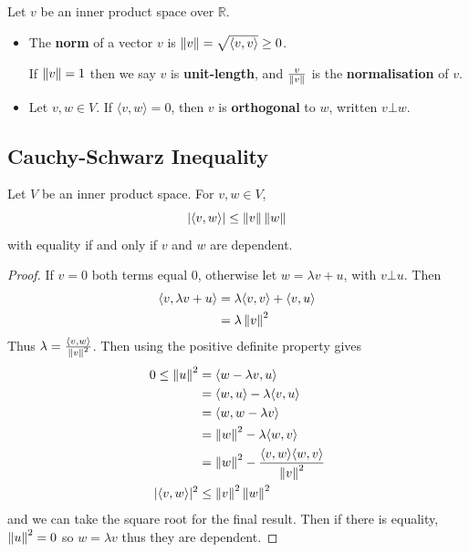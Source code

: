 \begin{definition}
    Let $v$ be an inner product space over $\mathbb{R}$.
    \begin{itemize}
      \item The {\bf norm} of a vector $v$ is $\left\lVert v \right\rVert = \sqrt{\langle v, v \rangle} \geq 0$.

        If $\left\lVert v \right\rVert = 1$ then we say $v$ is {\bf unit-length}, and $\frac{v}{ \left\lVert v \right\rVert}$ is the {\bf normalisation} of $v$.
      \item Let $v, w \in V$. If $ \langle v , w \rangle = 0$, then $v$ is {\bf orthogonal} to $w$, written $v \bot w$.
    \end{itemize}
\end{definition}

\subsection{Cauchy-Schwarz Inequality}

\begin{theorem}
  Let $V$ be an inner product space. For $v, w \in V$,
  \[| \langle v, w \rangle| \leq \left\lVert v \right\rVert \left\lVert w \right\rVert\]
  with equality if and only if $v$ and $w$ are dependent.
\end{theorem}
\begin{proof}
    If $v = 0$ both terms equal 0, otherwise let $w = \lambda v + u$, with $v \bot u$. Then
    \begin{align*}
      \langle v, \lambda v + u \rangle &= \lambda \langle v, v \rangle + \langle v, u \rangle \\
                                       &= \lambda \left\lVert v \right\rVert^2
    \end{align*}
    Thus $\lambda = \frac{\langle v, w \rangle}{ \left\lVert v \right\rVert^2}$. Then using the positive definite property gives
    \begin{align*}
      0 \leq \left\lVert u \right\rVert^2 &= \langle w - \lambda v, u \rangle \\
                        &= \langle w, u \rangle - \lambda \langle v, u \rangle \\
                        &= \langle w, w - \lambda v \rangle \\
                        &= \left\lVert w \right\rVert^2 - \lambda \langle w, v \rangle \\
                        &= \left\lVert w \right\rVert^2 - \frac{ \langle v, w \rangle \langle w, v \rangle}{ \left\lVert v \right\rVert^2} \\
                      |\langle v, w \rangle|^2  &\leq \left\lVert v \right\rVert^2 \left\lVert w \right\rVert^2
    \end{align*}
    and we can take the square root for the final result. Then if there is equality, $\left\lVert u \right\rVert^2 = 0$ so $w = \lambda v$ thus they are dependent.
\end{proof}

